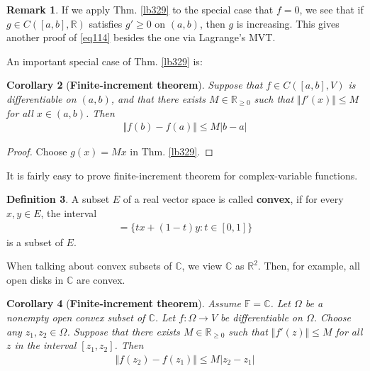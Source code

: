 \documentclass[12pt,b5paper,notitlepage]{article}
\theoremstyle{definition}
\newtheorem{df}{Definition}[section]
\newtheorem{rem}[df]{Remark}
\theoremstyle{plain}
\newtheorem{co}[df]{Corollary}
\newcommand{\Cbb}{\mathbb C}
\newcommand{\Rbb}{\mathbb R}
\newcommand{\Fbb}{\mathbb F}
\numberwithin{equation}{section}
\begin{document}
\begin{rem}
If we apply Thm. \ref{lb329} to the special case that $f=0$, we see that if $g\in C([a,b],\Rbb)$ satisfies $g'\geq0$ on $(a,b)$, then $g$ is increasing. This gives another proof of \eqref{eq114} besides the one via Lagrange's MVT.
\end{rem}


An important special case of Thm. \ref{lb329} is:

\begin{co}[\textbf{Finite-increment theorem}] \label{lb333}
Suppose that $f\in C([a,b],V)$ is differentiable on $(a,b)$, and that there exists $M\in\Rbb_{\geq0}$ such that $\Vert f'(x)\Vert\leq M$ for all $x\in(a,b)$. Then
\begin{align}
\Vert f(b)-f(a)\Vert\leq M|b-a|
\end{align}
\end{co}

\begin{proof}
Choose $g(x)=Mx$ in Thm. \ref{lb329}.
\end{proof}

It is fairly easy to prove finite-increment theorem for complex-variable functions.

\begin{df}\label{lb364}
A subset $E$ of a real vector space is called \textbf{convex},  if for every $x,y\in E$, the interval 
\begin{align}
[x,y]=\{tx+(1-t)y:t\in[0,1]\}
\end{align}
is a subset of $E$.
\end{df}

When talking about convex subsets of $\Cbb$, we view $\Cbb$ as $\Rbb^2$. Then, for example, all open disks in $\Cbb$ are convex.

\begin{co}[\textbf{Finite-increment theorem}]\label{lb335}
Assume $\Fbb=\Cbb$. Let $\Omega$ be a nonempty open convex subset of $\Cbb$. Let $f:\Omega\rightarrow V$ be differentiable on $\Omega$. Choose any $z_1,z_2\in\Omega$. Suppose that there exists $M\in\Rbb_{\geq0}$ such that $\Vert f'(z)\Vert\leq M$ for all $z$ in the interval $[z_1,z_2]$. Then 
\begin{align}
\Vert f(z_2)-f(z_1)\Vert\leq M|z_2-z_1|
\end{align}
\end{co}
\end{document}
